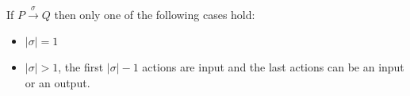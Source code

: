 \begin{lemma}\label{lemmastrongsequence}
  If $P\xrightarrow{\sigma} Q$ then only one of the following cases hold: 
  \begin{itemize}
    \item 
      $|\sigma|=1$
    \item
      $|\sigma|>1$, the first $|\sigma|-1$ actions are input and the last actions can be an input or an output.
  \end{itemize}
\end{lemma}




